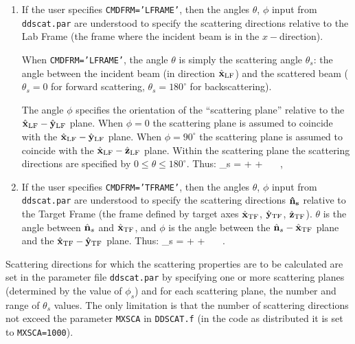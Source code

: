 \begin{enumerate}
\item If the user specifies {\tt CMDFRM='LFRAME'}, 
      then the angles $\theta$, $\phi$
      input from {\tt ddscat.par} are understood to specify the 
      scattering directions relative to the Lab Frame 
      (the frame where the incident beam is in the $x-$direction).

      When {\tt CMDFRM='LFRAME'}, 
      the angle $\theta$ is simply the scattering angle $\theta_s$: the
      angle between 
      the incident beam (in direction $\hat{\bf x}_{\rm LF}$) and the 
      scattered beam ($\theta_s=0$ for forward scattering, 
      $\theta_s=180^\circ$ for backscattering).

      The angle $\phi$ specifies the 
      orientation of the ``scattering 
      plane'' relative to the $\hat{\bf x}_{\rm LF} - \hat{\bf y}_{\rm LF}$ 
      plane.
      When $\phi=0$ the scattering plane is assumed to coincide with the
      $\hat{\bf x}_{\rm LF} - \hat{\bf y}_{\rm LF}$ plane.
      When $\phi=90^\circ$ the scattering plane is assumed to coincide with
      the ${\hat{\bf x}_{\rm LF}-\hat{\bf z}_{\rm LF}}$ plane.
      Within the scattering plane the scattering directions are specified by
      $0\leq\theta\leq180^\circ$.
      Thus:
\beq
{}_s = 
\xlf\cos\theta + \ylf\sin\theta\cos\phi + \zlf\sin\theta\sin\phi
~~~,~~~
\eeq

\item If the user specifies {\tt CMDFRM='TFRAME'},
      then the angles $\theta$, $\phi$
      input from {\tt ddscat.par} are understood to specify the
      scattering directions $\bf\hat{n}_s$ relative to the Target Frame
      (the frame defined by target axes $\hat{\bf x}_{\rm TF}$,
      $\hat{\bf y}_{\rm TF}$, $\hat{\bf z}_{\rm TF}$).
      $\theta$ is the angle between $\hat{\bf n}_s$ and $\hat{\bf x}_{\rm TF}$,
      and $\phi$ is the angle between the $\hat{\bf n}_s-\hat{\bf x}_{\rm TF}$ plane
      and the $\hat{\bf x}_{\rm TF}-\hat{\bf y}_{\rm TF}$ plane.
      Thus:
\beq
{}_s = \xtf\cos\theta + \ytf\sin\theta\cos\phi + \ztf\sin\theta\sin\phi
~~~.~~~
\eeq

\end{enumerate}

Scattering directions for which the scattering properties are to
be calculated are set in the parameter file {\tt ddscat.par} by
specifying one or more scattering planes (determined by the value of $\phi_s$)
and for each scattering plane, the number and range of $\theta_s$ values.
The only limitation is that the number of scattering directions not exceed
the parameter {\tt MXSCA} in {\tt DDSCAT.f} (in the code as distributed it
is set to {\tt MXSCA=1000}).

